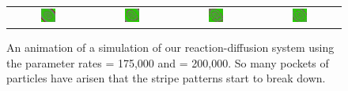 \begin{figure}[h]
\begin{tabular}{c c c c}
\includegraphics[width = 0.19\textwidth]{../images_CMYK/predator_prey_11_by_11_f_1.75_k_2_new_i4} & \includegraphics[width = 0.19\textwidth]{../images_CMYK/../images_CMYK/predator_prey_11_by_11_f_1.75_k_2_new_i5} & \includegraphics[width = 0.19\textwidth]{../images_CMYK/../images_CMYK/predator_prey_11_by_11_f_1.75_k_2_new_i6} & \includegraphics[width = 0.19\textwidth]{../images_CMYK/../images_CMYK/predator_prey_11_by_11_f_1.75_k_2_new_i7}
\end{tabular}
\caption{An animation of a simulation of our reaction-diffusion system using the parameter rates  = 175,000 and  = 200,000. So many pockets of  particles have arisen that the stripe patterns start to break down.}
\label{fig:k=200000_f=175000}
\end{figure}

